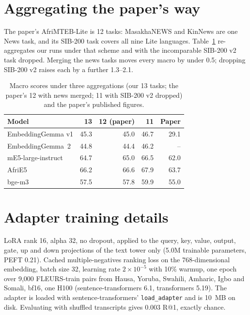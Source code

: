 \documentclass[conference]{IEEEtran}
\makeatletter
\newcommand{\eg}{EmbeddingGemma}
\newcommand{\egtwo}{EmbeddingGemma~2}
\newcommand{\rone}{R@1}
\makeatother
\begin{document}
\section{Aggregating the paper's way}
\label{app:agg}

The paper's AfriMTEB-Lite is 12 tasks: MasakhaNEWS and KinNews are one News
task, and its SIB-200 task covers all nine Lite languages. Table~\ref{tab:agg}
re-aggregates our runs under that scheme and with the incomparable SIB-200 v2
task dropped. Merging the news tasks moves every macro by under 0.5; dropping SIB-200 v2 raises each by a further 1.3--2.1.

\begin{table}[t]
  \centering
  \caption{Macro scores under three aggregations (our 13 tasks; the paper's
  12 with news merged; 11 with SIB-200 v2 dropped) and the paper's published
  figures.}
  \label{tab:agg}
  \small
  \setlength{\tabcolsep}{4pt}
  \begin{tabular}{lrrrr}
    \toprule
    Model & 13 & 12 (paper) & 11 & Paper \\
    \midrule
    \eg{} v1 & 45.3 & 45.0 & 46.7 & 29.1 \\
    \egtwo{} & 44.8 & 44.4 & 46.2 & -- \\
    mE5-large-instruct & 64.7 & 65.0 & 66.5 & 62.0 \\
    AfriE5 & 66.2 & 66.6 & 67.9 & 63.7 \\
    bge-m3 & 57.5 & 57.8 & 59.9 & 55.0 \\
    \bottomrule
  \end{tabular}
\end{table}

\section{Adapter training details}
\label{app:train}

LoRA rank 16, alpha 32, no dropout, applied to the query, key, value, output,
gate, up and down projections of the text tower only (5.0M trainable
parameters, PEFT 0.21). Cached multiple-negatives ranking loss on the
768-dimensional embedding, batch size 32, learning rate $2\times10^{-5}$ with
10\% warmup, one epoch over 9,000 FLEURS-train pairs from Hausa, Yoruba,
Swahili, Amharic, Igbo and Somali, bf16, one H100 (sentence-transformers 6.1,
transformers 5.19). The adapter is loaded with sentence-transformers'
\texttt{load\_adapter} and is 10~MB on disk. Evaluating with shuffled
transcripts gives 0.003 \rone{}, exactly chance.



\end{document}
